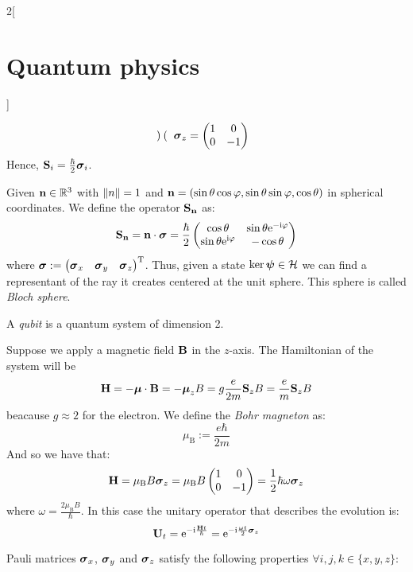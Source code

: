 \documentclass[../../../main_physics.tex]{subfiles}
\begin{document}
\begin{multicols}{2}[\section{Quantum physics}]
\begin{definition}
$$\begin{pmatrix}
      \end{pmatrix}\quad\boldsymbol{\mathrm{\sigma}}_z=
      \begin{pmatrix}
        1 & 0  \\
        0 & -1
      \end{pmatrix}$$
    Hence, $\boldsymbol{\mathrm{S}}_i=\frac{\hbar}{2}\boldsymbol{\mathrm{\sigma}}_i$.
  \end{definition}
  \begin{definition}
    Given $\boldsymbol{\mathrm{n}}\in\mathbb{R}^3$ with $\left\|n\right\|=1$ and $\boldsymbol{\mathrm{n}}=(\sin\theta\cos\varphi,\sin\theta\sin\varphi,\cos\theta)$ in spherical coordinates. We define the operator $\boldsymbol{\mathrm{S}}_{\boldsymbol{\mathrm{n}}}$ as:
    $$\boldsymbol{\mathrm{S}}_{\boldsymbol{\mathrm{n}}}=\boldsymbol{\mathrm{n}}\cdot\boldsymbol{\mathrm{\sigma}}=\frac{\hbar}{2}\begin{pmatrix}
        \cos\theta                 & \sin\theta\mathrm{e}^{-\mathrm{i}\varphi} \\
        \sin\theta\mathrm{e}^{\mathrm{i}\varphi} & -\cos\theta
      \end{pmatrix}$$
    where $\boldsymbol{\mathrm{\sigma}}:={\begin{pmatrix}
          \boldsymbol{\mathrm{\sigma}}_x & \boldsymbol{\mathrm{\sigma}}_y & \boldsymbol{\mathrm{\sigma}}_z
        \end{pmatrix}}^{\mathrm{T}}$.
    Thus, given a state $\ker{\boldsymbol{\mathrm{\psi}}}\in\mathcal{H}$ we can find a representant of the ray it creates centered at the unit sphere. This sphere is called \emph{Bloch sphere}.
  \end{definition}
  \begin{definition}
    A \emph{qubit} is a quantum system of dimension 2.
  \end{definition}
  \begin{definition}
    Suppose we apply a magnetic field $\boldsymbol{\mathrm{B}}$ in the $z$-axis. The Hamiltonian of the system will be $$\boldsymbol{\mathrm{H}}=-\boldsymbol{\mathrm{\mu}}\cdot\boldsymbol{\mathrm{B}}=-\boldsymbol{\mathrm{\mu}}_z B=g\frac{e}{2m} \boldsymbol{\mathrm{S}}_z B = \frac{e}{m}\boldsymbol{\mathrm{S}}_z B$$ beacause $g\approx 2$ for the electron.
    We define the \emph{Bohr magneton} as: $$\mu_{\mathrm{B}}:=\frac{e\hbar}{2 m}$$
    And so we have that: $$\boldsymbol{\mathrm{H}}=\mu_{\mathrm{B}} B\boldsymbol{\mathrm{\sigma}}_z=\mu_{\mathrm{B}} B\begin{pmatrix}
        1 & 0  \\
        0 & -1
      \end{pmatrix}=\frac{1}{2}\hbar \omega\boldsymbol{\mathrm{\sigma}}_z$$
    where $\omega=\frac{2\mu_{\mathrm{B}} B}{\hbar}$. In this case the unitary operator that describes the evolution is: $$\boldsymbol{\mathrm{U}}_t=\mathrm{e}^{-\mathrm{i}\frac{\boldsymbol{\mathrm{H}}t}{\hbar}}=\mathrm{e}^{-\mathrm{i}\frac{\omega t}{2}\boldsymbol{\mathrm{\sigma}}_z}$$
  \end{definition}
  \begin{proposition}
    Pauli matrices $\boldsymbol{\mathrm{\sigma}}_x$, $\boldsymbol{\mathrm{\sigma}}_y$ and $\boldsymbol{\mathrm{\sigma}}_z$ satisfy the following properties $\forall i,j,k\in\{x,y,z\}$:

\end{proposition}
\end{multicols}
\end{document}
